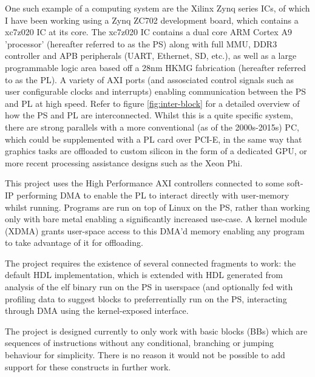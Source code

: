 \documentclass[a4paper]{article}
\begin{document}
One such example of a computing system are the Xilinx Zynq series ICs, of which I have been working using a Zynq ZC702\cite{ZC702} development board, which contains a xc7z020 IC at its core. The xc7z020 IC contains a dual core ARM Cortex A9 'processor' (hereafter referred to as the PS) along with full MMU, DDR3 controller and APB peripherals (UART, Ethernet, SD, etc.), as well as a large programmable logic area based off a 28nm HKMG fabrication (hereafter referred to as the PL). A variety of AXI ports (and assosciated control signals such as user configurable clocks and interrupts) enabling communication between the PS and PL at high speed. Refer to figure \ref{fig:inter-block} for a detailed overview of how the PS and PL are interconnected. Whilst this is a quite specific system, there are strong parallels with a more conventional (as of the 2000s-2015s) PC, which could be supplemented with a PL card over PCI-E, in the same way that graphics tasks are offloaded to custom silicon in the form of a dedicated GPU, or more recent processing assistance designs such as the Xeon Phi.

This project uses the High Performance AXI controllers connected to some soft-IP performing DMA to enable the PL to interact directly with user-memory whilst running. Programs are run on top of Linux on the PS, rather than working only with bare metal enabling a significantly increased use-case. A kernel module (XDMA) grants user-space access to this DMA'd memory enabling any program to take advantage of it for offloading.

The project requires the existence of several connected fragments to work: the default HDL implementation, which is extended with HDL generated from analysis of the elf binary run on the PS in userspace (and optionally fed with profiling data to suggest blocks to preferrentially run on the PS, interacting through DMA using the kernel-exposed interface.

The project is designed currently to only work with basic blocks (BBs) which are sequences of instructions without any conditional, branching or jumping behaviour for simplicity. There is no reason it would not be possible to add support for these constructs in further work.
\end{document}
